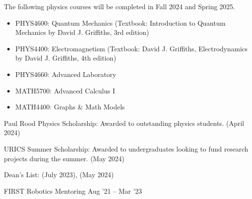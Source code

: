 \documentclass[11pt,a4paper]{article} %
\begin{document}
\spacedhrule{1.0em}{-0.4em}


The following physics courses will be completed in Fall 2024 and Spring 2025.

\vspace{-0.5em}

\begin{itemize}{}{}
    \item{PHYS4600:} Quantum Mechanics (Textbook: Introduction to Quantum Mechanics by David J. Griffiths, 3rd edition)
    \item{PHYS4400:} Electromagnetism (Textbook: David J. Griffiths, Electrodynamics by David J. Griffiths, 4th edition)
    \item{PHYS4660:} Advanced Laboratory
    \item{MATH5700:} Advanced Calculus I
    \item{MATH4400:} Graphs \& Math Models
\end{itemize}

\spacedhrule{0em}{-0.4em}



\inlineheadsection
{Paul Rood Physics Scholarship:}
{Awarded to outstanding physics students. (April 2024)}

\inlineheadsection
{URICS Summer Scholarship:}
{Awarded to undergraduates looking to fund research projects during the summer. (May 2024)}

\inlineheadsection
{Dean's List:}
{(July 2023), (May 2024)}

\spacedhrule{1.6em}{-0.4em}



\headedsubsection
{FIRST Robotics Mentoring}
{Aug '21 -- Mar '23}
{}
\end{document}
